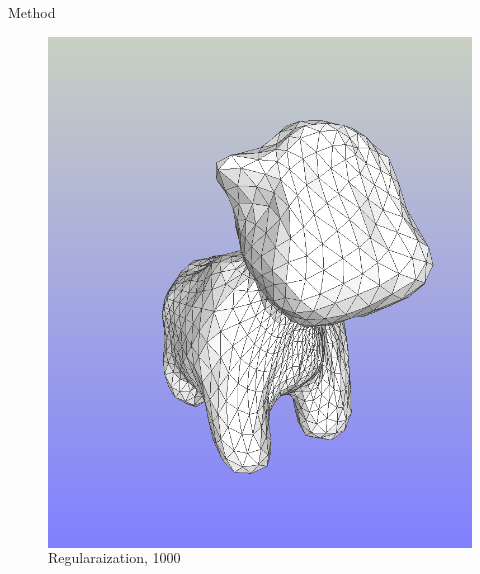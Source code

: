 \documentclass[beamer]{standalone}
\begin{document}
\begin{frame}{Method}
\begin{figure}
\begin{columns}[t]
                    \includegraphics[width=\linewidth]{./figures/spot-reg.png}
                    \caption{Regularaization, 1000}


\end{columns}
\end{figure}
\end{frame}
\end{document}
